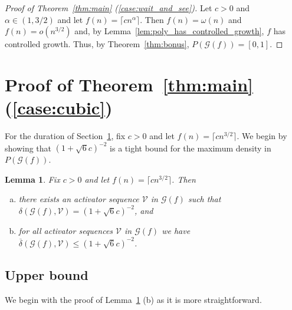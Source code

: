 \documentclass[12pt]{article}
\newtheorem{lemma}[theorem]{Lemma}
\theoremstyle{remark}
\newcommand\cG{\mathcal G}
\newcommand\cV{\mathcal V}
\begin{document}
\begin{proof}[Proof of Theorem~\ref{thm:main} (\ref{case:wait_and_see})]
Let $c > 0$ and $\alpha \in (1, 3/2)$ and let $f(n) = \lceil cn^\alpha \rceil$. Then $f(n) = \omega(n)$ and $f(n) = o(n^{3/2})$ and, by Lemma~\ref{lem:poly_has_controlled_growth}, $f$ has controlled growth. Thus, by Theorem~\ref{thm:bonus}, $P(\cG(f)) = [0,1]$. 
\end{proof}

\section{Proof of Theorem~\ref{thm:main} (\ref{case:cubic})} \label{sec:cubic}

For the duration of Section~\ref{sec:cubic}, fix $c > 0$ and let $f(n) = \lceil cn^{3/2} \rceil$. We begin by showing that $(1+\sqrt{6}c)^{-2}$ is a tight bound for the maximum density in $P(\cG(f))$.
\begin{lemma}\label{lem:3/2main}
Fix $c > 0$ and let $f(n) = \lceil cn^{3/2} \rceil$. Then
\begin{enumerate}[(a)]
\item there exists an activator sequence $\cV$ in $\cG(f)$ such that $\delta(\cG(f),\cV) = (1+\sqrt{6}c)^{-2}$, and 
\item for all activator sequences $\cV$ in $\cG(f)$ we have $\overline{\delta}(\cG(f),\cV) \leq (1+\sqrt{6}c)^{-2}$.
\end{enumerate}
\end{lemma}

\subsection{Upper bound}\label{sec:upperbound}

We begin with the proof of Lemma~\ref{lem:3/2main} (b) as it is more straightforward. 
\end{document}
